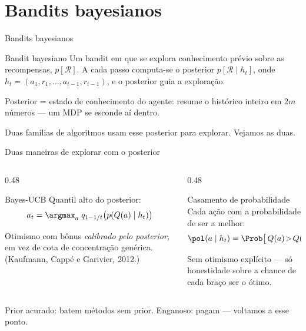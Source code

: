 \documentclass[aspectratio=169, 11pt]{beamer}
\newcommand{\hist}{h_t}
\begin{document}
\section{Bandits bayesianos}

\begin{frame}{Bandits bayesianos}
  \begin{defbox}{Bandit bayesiano}
    Um bandit em que se explora conhecimento prévio sobre as recompensas,
    $p[\mathcal{R}]$. A cada passo computa-se o posterior
    $p[\mathcal{R} \mid \hist]$, onde
    $\hist = (a_1, r_1, \ldots, a_{t-1}, r_{t-1})$, e o posterior guia a
    exploração.
  \end{defbox}

  \begin{ideiabox}
    Posterior = \alert{estado de conhecimento} do agente: resume o
    histórico inteiro em $2m$ números — um MDP se esconde aí dentro.
  \end{ideiabox}

  \medskip
  {\small\color{rlCinza} Duas famílias de algoritmos usam esse posterior
  para explorar. Vejamos as duas.}
\end{frame}

\begin{frame}{Duas maneiras de explorar com o posterior}
  \begin{columns}[T]
    \begin{column}{0.48\textwidth}
      \begin{teobox}{Bayes-UCB}
        Quantil alto do posterior:
        \[ a_t = \argmax_{a} \; q_{1 - 1/t}\big(p(Q(a) \mid \hist)\big) \]
        \vspace{-1.2em}

        Otimismo com bônus \emph{calibrado pelo posterior}, em vez de
        cota de concentração genérica.
        {\scriptsize (Kaufmann, Cappé e Garivier, 2012.)}
      \end{teobox}
    \end{column}
    \begin{column}{0.48\textwidth}
      \begin{teobox}{Casamento de probabilidade}
        Cada ação com a probabilidade de ser a melhor:
        \[ \pol(a \mid \hist) = \Prob\big[\,Q(a) \!>\! Q(a')\ \forall a'\neq a \mid \hist\,\big] \]
        \vspace{-1.2em}

        Sem otimismo explícito — só honestidade sobre a chance de cada
        braço ser o ótimo.
      \end{teobox}
    \end{column}
  \end{columns}

  \medskip
  {\small\color{rlCinza} Prior acurado: batem métodos sem prior.
  Enganoso: pagam — voltamos a esse ponto.}
\end{frame}
\end{document}
